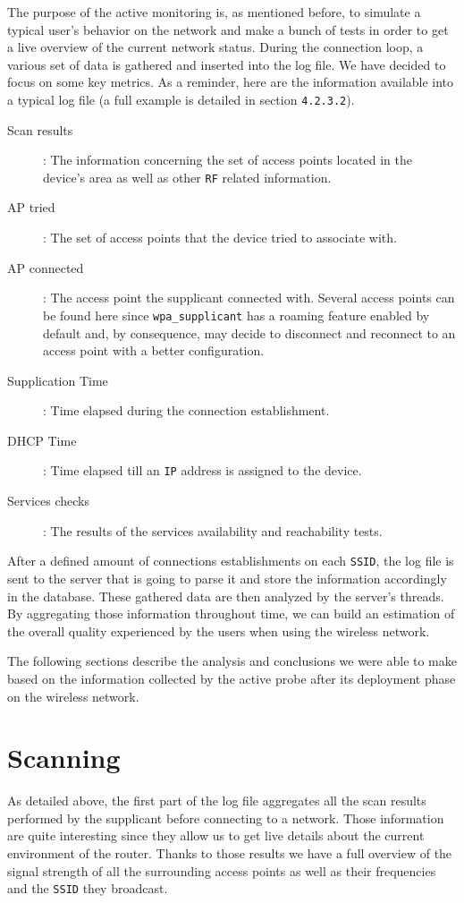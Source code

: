 The purpose of the active monitoring is, as mentioned before, to simulate a typical user's behavior on the network and make a bunch of tests in order to get a live overview of the current network status. During the connection loop, a various set of data is gathered and inserted into the log file. We have decided to focus on some key metrics. As a reminder, here are the information available into a typical log file (a full example is detailed in section \texttt{4.2.3.2}).

\begin{description}
	\item[Scan results]: The information concerning the set of access points located in the device's area as well as other \texttt{RF} related information.
	\item[AP tried]: The set of access points that the device tried to associate with.
	\item[AP connected]: The access point the supplicant connected with. Several access points can be found here since \texttt{wpa\_supplicant} has a roaming feature enabled by default and, by consequence, may decide to disconnect and reconnect to an access point with a better configuration.
	\item[Supplication Time]: Time elapsed during the connection establishment.
	\item [DHCP Time]: Time elapsed till an \texttt{IP} address is assigned to the device.
	\item [Services checks]: The results of the services availability and reachability tests.
\end{description}

After a defined amount of connections establishments on each \texttt{SSID}, the log file is sent to the server that is going to parse it and store the information accordingly in the database. These gathered data are then analyzed by the server's threads. By aggregating those information throughout time, we can build an estimation of the overall quality experienced by the users when using the wireless network.

The following sections describe the analysis and conclusions we were able to make based on the information collected by the active probe after its deployment phase on the wireless network.


\section{Scanning}
As detailed above, the first part of the log file aggregates all the scan results performed by the supplicant before connecting to a network. Those information are quite interesting since they allow us to get live details about the current environment of the router. Thanks to those results we have a full overview of the signal strength of all the surrounding access points as well as their frequencies and the \texttt{SSID} they broadcast. 


